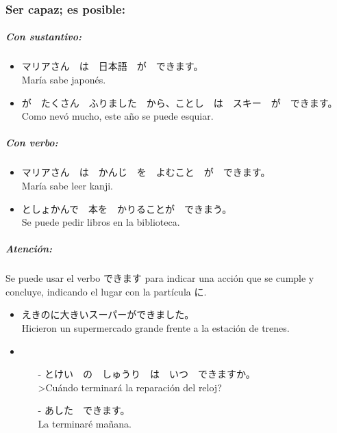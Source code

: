 \documentclass[a4paper,12pt,oneside]{report}
\def\bv{\textbf{V}} %
\def\bs{\textbf{S}} %
\begin{document}
\begin{CJK*}{UTF8}{min}
      \subsubsection{Ser capaz; es posible:}
        \fbox{\bs/\bv(じしょ) こと　が　できます}

        \subparagraph{Con sustantivo:}

        \begin{itemize}
          \item マリアさん　は　日本語　が　できます。\\
                Mar\'ia sabe japon\'es.
          \item {}が　たくさん　ふりました　から、ことし　は　スキー　が　できます。\\
                Como nev\'o mucho, este año se puede esquiar.
        \end{itemize}

        \subparagraph{Con verbo:}

        \begin{itemize}
          \item マリアさん　は　かんじ　を　よむこと　が　できます。\\
                Mar\'ia sabe leer kanji.
          \item としょかんで　本を　かりることが　できまう。\\
                Se puede pedir libros en la biblioteca.
        \end{itemize}

        \subparagraph{Atenci\'on:}
          Se puede usar el verbo {できます} para indicar una acci\'on que se cumple y concluye, indicando el lugar con la part\'icula に.

        \begin{itemize}
          \item えきのに大きいスーパーができました。\\
                Hicieron un supermercado grande frente a la estaci\'on de trenes.
          \item
            \begin{itemize}
              \item[-] とけい　の　しゅうり　は　いつ　できますか。\\
                       >Cu\'ando terminar\'a la reparaci\'on del reloj?
              \item[-] あした　できます。\\
                       La terminar\'e mañana.
            \end{itemize}
        \end{itemize}


\end{CJK*}
\end{document}
